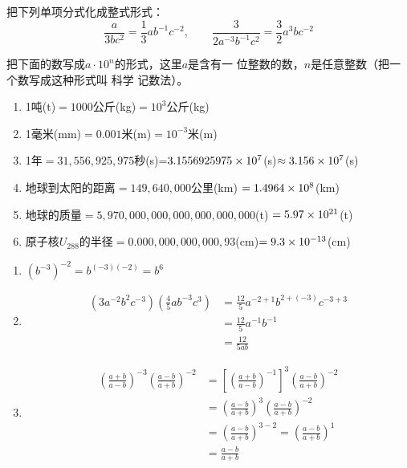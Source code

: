 \begin{example}
    把下列单项分式化成整式形式：
    \[\frac{a}{3bc^2}=\frac{1}{3}ab^{-1}c^{-2},\qquad \frac{3}{2a^{-3}b^{-1}c^2}=\frac{3}{2}a^3bc^{-2}  \]
\end{example}

\begin{example}
    把下面的数写成$a\cdot 10^n$的形式，这里$a$是含有一
位整数的数，$n$是任意整数（把一个数写成这种形式叫 科学
记数法）。
    \begin{enumerate}
        \item 1吨(t)$=1000$公斤(kg)$=10^3$公斤(kg)
        \item  1毫米(mm)$=0.001$米(m)$=10^{-3}$米(m)
        \item  1年$=31,556,925,975$秒(s)=$3.1556925975\times10^7$(s)$\approx 3.156\times10^7$(s)
        \item   地球到太阳的距离$=149,640,000$公里(km)
        $=1.4964\times10^8$(km)
        \item    地球的质量$=5,970,000,000,000,000,000,000$(t)
        $=5.97\times10^{21}$(t)
        \item    原子核$U_{288}$的半径$=0.000,000,000,000,93$(cm)$=9.3\times10^{-13}$(cm)
    \end{enumerate}
\end{example}

\begin{example}
\begin{enumerate}
    \item $(b^{-3})^{-2}=b^{(-3)(-2)}=b^6$
    \item \[\begin{split}
        \left(3a^{-2}b^2c^{-3}\right)\left(\frac{4}{5}ab^{-3}c^3\right)&=\frac{12}{5}a^{-2+ 1}b^{2+(-3)}c^{-3+3}\\
        &=\frac{12}{5}a^{-1}b^{-1}\\
        &=\frac{12}{5ab}
    \end{split}\]
    \item \[\begin{split}
        \left(\frac{a+b}{a-b}\right)^{-3}\left(\frac{a-b}{a+b}\right)^{-2}&=\left[\left(\frac{a+b}{a-b}\right)^{-1}\right]^{3} \left(\frac{a-b}{a+b}\right)^{-2}\\
        &=\left(\frac{a-b}{a+b}\right)^{3}\left(\frac{a-b}{a+b}\right)^{-2}\\
        &=\left(\frac{a-b}{a+b}\right)^{3-2}=\left(\frac{a-b}{a+b}\right)^{1}\\
        &=\frac{a-b}{a+b}
    \end{split}\]
\end{enumerate}
\end{example}

